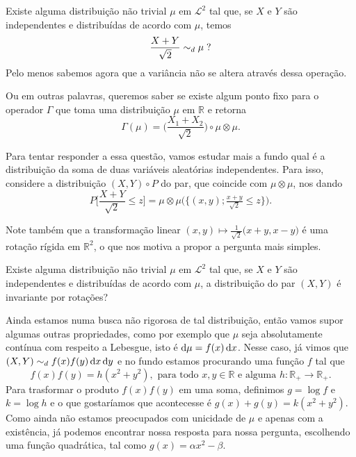 \begin{question}
  \label{q:ponto_fixo_soma}
  Existe alguma distribuição não trivial $\mu$ em $\mathcal{L}^2$ tal que, se $X$ e $Y$ são independentes e distribuídas de acordo com $\mu$, temos
  \begin{equation}
    \frac{X + Y}{\sqrt{2}} \sim_d \mu \; ?
  \end{equation}
  Pelo menos sabemos agora que a variância não se altera através dessa operação.
\end{question}

Ou em outras palavras, queremos saber se existe algum ponto fixo para o operador $\Gamma$ que toma uma distribuição $\mu$ em $\mathbb{R}$ e retorna
\begin{equation}
  \label{e:Gamma_operador}
  \Gamma(\mu) = \Big( \frac{X_1 + X_2}{\sqrt{2}} \Big) \circ \mu \otimes \mu.
\end{equation}


Para tentar responder a essa questão, vamos estudar mais a fundo qual é a distribuição da soma de duas variáveis aleatórias independentes.
Para isso, considere a distribuição $(X,Y) \circ P$ do par, que coincide com $\mu \otimes \mu$, nos dando
\begin{equation}
  P\Big[ \frac{X + Y}{\sqrt{2}} \leq z \Big] = \mu \otimes \mu \big( \big\{(x, y); \tfrac{x + y}{\sqrt{2}} \leq z \big\} \big).
\end{equation}

Note também que a transformação linear $(x,y) \mapsto \tfrac{1}{\sqrt{2}}\big(x + y, x - y\big)$ é uma rotação rígida em $\mathbb{R}^2$, o que nos motiva a propor a pergunta mais simples.

\begin{question}
  Existe alguma distribuição não trivial $\mu$ em $\mathcal{L}^2$ tal que, se $X$ e $Y$ são independentes e distribuídas de acordo com $\mu$, a distribuição do par $(X,Y)$ é invariante por rotações?
\end{question}

Ainda estamos numa busca não rigorosa de tal distribuição, então vamos supor algumas outras propriedades, como por exemplo que $\mu$ seja absolutamente contínua com respeito a Lebesgue, isto é $\mathop{}\!\mathrm{d} \mu = f(x) \mathop{}\!\mathrm{d} x$.
Nesse caso, já vimos que $(X, Y) \sim_d f(x) f(y) \mathop{}\!\mathrm{d} x \mathop{}\!\mathrm{d} y$ e no fundo estamos procurando uma função $f$ tal que
\begin{equation}
  f(x) f(y) = h(x^2 + y^2), \text{ para todo $x, y \in \mathbb{R}$ e alguma $h: \mathbb{R}_+ \to \mathbb{R}_+$.}
\end{equation}
Para trasformar o produto $f(x) f(y)$ em uma soma, definimos $g = \log f$ e $k = \log h$ e o que gostaríamos que acontecesse é $g(x) + g(y) = k(x^2 + y^2)$.
Como ainda não estamos preocupados com unicidade de $\mu$ e apenas com a existência, já podemos encontrar nossa resposta para nossa pergunta, escolhendo uma função quadrática, tal como $g(x) = \alpha x^2 - \beta$.


